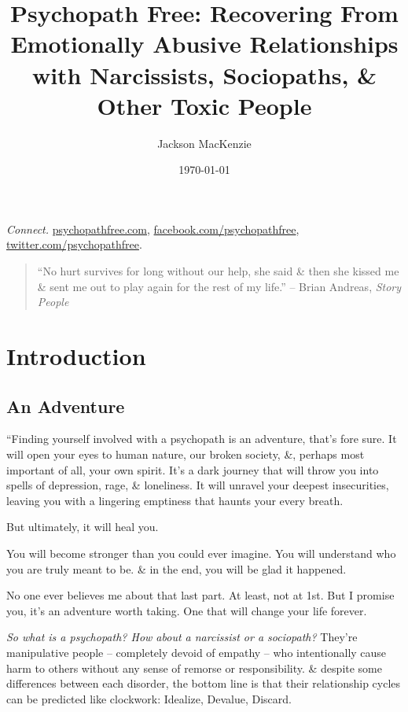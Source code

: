 \documentclass{article}
\title{Psychopath Free: Recovering From Emotionally Abusive Relationships with Narcissists, Sociopaths, \& Other Toxic People}
\author{Jackson MacKenzie}
\date{\today}
\numberwithin{equation}{section}
\begin{document}
\maketitle
\tableofcontents
\vspace{5mm}


\textit{Connect.} \url{psychopathfree.com}, \url{facebook.com/psychopathfree}, \url{twitter.com/psychopathfree}.

\begin{quotation}
	``No hurt survives for long without our help, she said \& then she kissed me \& sent me out to play again for the rest of my life.'' -- Brian Andreas, \textit{Story People}
\end{quotation}

\section{Introduction}

\subsection{An Adventure}
``Finding yourself involved with a psychopath is an adventure, that's fore sure. It will open your eyes to human nature, our broken society, \&, perhaps most important of all, your own spirit. It's a dark journey that will throw you into spells of depression, rage, \& loneliness. It will unravel your deepest insecurities, leaving you with a lingering emptiness that haunts your every breath.

But ultimately, it will heal you.

You will become stronger than you could ever imagine. You will understand who you are truly meant to be. \& in the end, you will be glad it happened.

No one ever believes me about that last part. At least, not at 1st. But I promise you, it's an adventure worth taking. One that will change your life forever.

\textit{So what is a psychopath? How about a narcissist or a sociopath?} They're manipulative people -- completely devoid of empathy -- who intentionally cause harm to others without any sense of remorse or responsibility. \& despite some differences between each disorder, the bottom line is that their relationship cycles can be predicted like clockwork: Idealize, Devalue, Discard.
\end{document}
